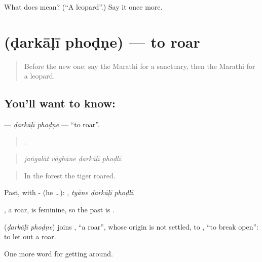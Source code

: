 \begin{tcolorbox}[breakable,colback=teal!4,colframe=teal!35!black,title={Before you move on}]
What does  mean? (\textquotedblleft{}A leopard\textquotedblright{}.) Say it once more.
\end{tcolorbox}
\section[\texorpdfstring{\mr{डरकाळी} \mr{फोडणे} (ḍarkāḷī phoḍṇe)}{डरकाळी फोडणे (ḍarkāḷī phoḍṇe)}]{  (ḍarkāḷī phoḍṇe) — to roar}

\label{lesson:MR-C446-darkali-phodne}



\begin{quote}
Before the new one: say the Marathi for a sanctuary, then the Marathi for a leopard.
\end{quote}

\subsection*{You'll want to know:  }
\textbf{ } — \emph{ḍarkāḷī phoḍṇe} — \textquotedblleft{}to roar\textquotedblright{}.

\begin{quote}
   .
\end{quote}

\begin{quote}
\emph{jaṅgalāt vāghāne ḍarkāḷī phoḍlī.}
\end{quote}

\begin{quote}
In the forest the tiger roared.
\end{quote}

Past, with - (he …):   , \emph{tyāne ḍarkāḷī phoḍlī}.

, a roar, is feminine, so the past is  .

\begin{cousinweb}
\textbf{ } (\emph{ḍarkāḷī phoḍṇe}) joins \textbf{}, \textquotedblleft{}a roar\textquotedblright{}, whose origin is not settled, to \textbf{}, \textquotedblleft{}to break open\textquotedblright{}: to let out a roar.
\end{cousinweb}

\begin{grammarlens}[title={What you've built}]
One more word for getting around.
\end{grammarlens}

